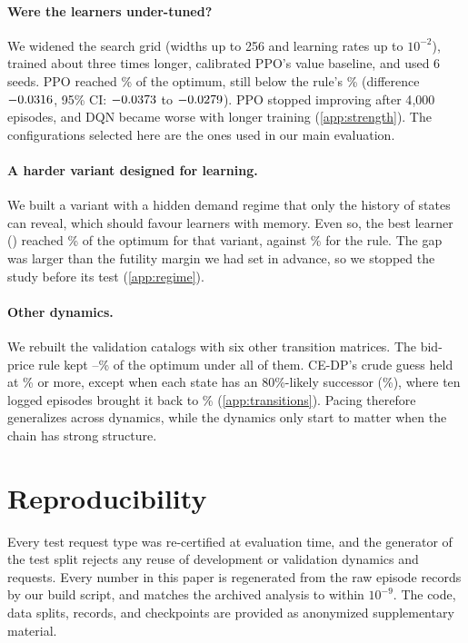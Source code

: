 \documentclass[10pt]{article}
\begin{document}
\paragraph{Were the learners under-tuned?} We widened the search grid (widths up to 256 and learning rates up to $10^{-2}$), trained about three times longer, calibrated PPO's value baseline, and used 6 seeds. PPO reached \lsPPOFrac\% of the optimum, still below the rule's \lsRuleFrac\% (difference $-0.0316$, 95\% CI: $-0.0373$ to $-0.0279$). PPO stopped improving after 4{,}000 episodes, and DQN became worse with longer training (\cref{app:strength}). The configurations selected here are the ones used in our main evaluation.

\paragraph{A harder variant designed for learning.} We built a variant with a hidden demand regime that only the history of states can reveal, which should favour learners with memory. Even so, the best learner (\rgBestName) reached \rgBestFrac\% of the optimum for that variant, against \rgRuleFrac\% for the rule. The gap was larger than the futility margin we had set in advance, so we stopped the study before its test (\cref{app:regime}).

\paragraph{Other dynamics.} We rebuilt the validation catalogs with six other transition matrices. The bid-price rule kept \trBpMin--\trBpMax\% of the optimum under all of them. CE-DP's crude guess held at \trCeOkMin\% or more, except when each state has an 80\%-likely successor (\trCeSucc\%), where ten logged episodes brought it back to \trCeSuccKten\% (\cref{app:transitions}). Pacing therefore generalizes across dynamics, while the dynamics only start to matter when the chain has strong structure.

\section{Reproducibility}\label{sec:audit}

Every test request type was re-certified at evaluation time, and the generator of the test split rejects any reuse of development or validation dynamics and requests. Every number in this paper is regenerated from the raw episode records by our build script, and matches the archived analysis to within $10^{-9}$. The code, data splits, records, and checkpoints are provided as anonymized supplementary material.
\end{document}
